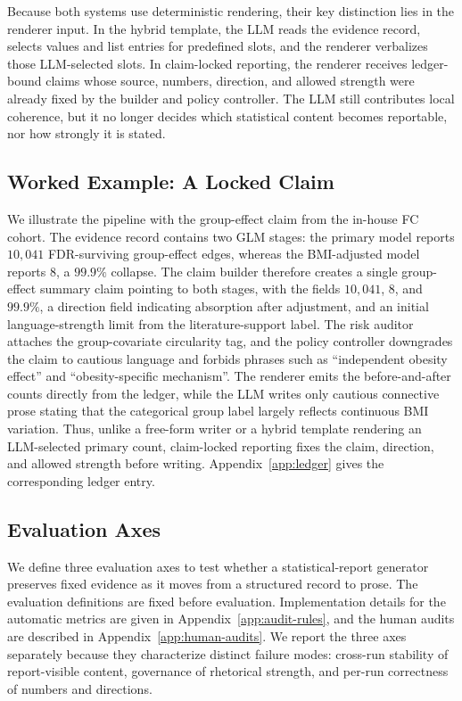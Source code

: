 \documentclass[10pt,twocolumn]{article}
\begin{document}
Because both systems use deterministic rendering, their key distinction lies in the renderer input. In the hybrid template, the LLM reads the evidence record, selects values and list entries for predefined slots, and the renderer verbalizes those LLM-selected slots. In claim-locked reporting, the renderer receives ledger-bound claims whose source, numbers, direction, and allowed strength were already fixed by the builder and policy controller. The LLM still contributes local coherence, but it no longer decides which statistical content becomes reportable, nor how strongly it is stated.

\subsection{Worked Example: A Locked Claim}
\label{sec:worked}

We illustrate the pipeline with the group-effect claim from the in-house FC cohort. The evidence record contains two GLM stages: the primary model reports $10{,}041$ FDR-surviving group-effect edges, whereas the BMI-adjusted model reports $8$, a $99.9\%$ collapse. The claim builder therefore creates a single group-effect summary claim pointing to both stages, with the fields $10{,}041$, $8$, and $99.9\%$, a direction field indicating absorption after adjustment, and an initial language-strength limit from the literature-support label. The risk auditor attaches the group-covariate circularity tag, and the policy controller downgrades the claim to cautious language and forbids phrases such as ``independent obesity effect'' and ``obesity-specific mechanism''. The renderer emits the before-and-after counts directly from the ledger, while the LLM writes only cautious connective prose stating that the categorical group label largely reflects continuous BMI variation. Thus, unlike a free-form writer or a hybrid template rendering an LLM-selected primary count, claim-locked reporting fixes the claim, direction, and allowed strength before writing. Appendix~\ref{app:ledger} gives the corresponding ledger entry.

\subsection{Evaluation Axes}
\label{sec:audit}

We define three evaluation axes to test whether a statistical-report generator preserves fixed evidence as it moves from a structured record to prose. The evaluation definitions are fixed before evaluation. Implementation details for the automatic metrics are given in Appendix~\ref{app:audit-rules}, and the human audits are described in Appendix~\ref{app:human-audits}. We report the three axes separately because they characterize distinct failure modes: cross-run stability of report-visible content, governance of rhetorical strength, and per-run correctness of numbers and directions.
\end{document}
